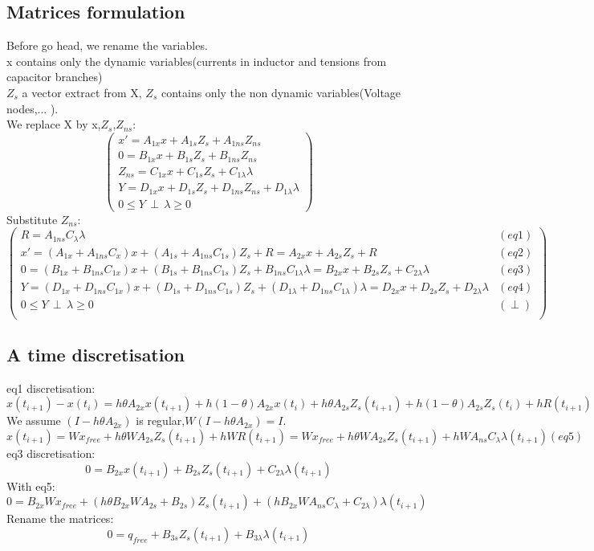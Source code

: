 \documentclass[10pt]{article}
\begin{document}
\subsection{Matrices formulation}
Before go head, we rename the variables.\\
x contains only the dynamic variables(currents in inductor and tensions from capacitor branches)\\
$Z_{s}$ a vector extract from X, $Z_{s}$ contains only the non dynamic variables(Voltage nodes,... ).\\

We replace X by x,$Z_{s}$,$Z_{ns}$:
\[\left(\begin{array}{c}
x'=A_{1x}x +A_{1s}Z_{s} + A_{1ns}Z_{ns}\\
0=B_{1x}x+B_{1s}Z_{s} + B_{1ns}Z_{ns}\\
Z_{ns}= C_{1x}x+C_{1s}Z_{s}+C_{1\lambda}\lambda \\
Y=D_{1x}x +D_{1s}Z_{s}+D_{1ns}Z_{ns}+D_{1\lambda}\lambda\\
0 \leq Y \, \perp \, \lambda \geq 0
\end{array}\right)\]
Substitute $Z_{ns}$:
\[\left(\begin{array}{cc}
R=A_{1ns}C_{\lambda}\lambda &(eq1)\\
x'=(A_{1x}+A_{1ns}C_{x})x +(A_{1s}+A_{1ns}C_{1s})Z_{s} +R=A_{2x}x +A_{2s}Z_{s} +R&(eq2)\\
0=(B_{1x}+B_{1ns}C_{1x})x+(B_{1s}+B_{1ns}C_{1s})Z_{s} + B_{1ns}C_{1\lambda}\lambda = B_{2x}x+B_{2s}Z_{s} + C_{2\lambda}\lambda&(eq3)\\
Y=(D_{1x}+D_{1ns}C_{1x})x+(D_{1s}+D_{1ns}C_{1s})Z_{s}+(D_{1\lambda}+D_{1ns}C_{1\lambda})\lambda = D_{2x}x+D_{2s}Z_{s}+D_{2\lambda}\lambda &(eq4)\\
0 \leq Y \, \perp \, \lambda \geq 0&(\perp)\\
\end{array}\right)\]
\newpage

\subsection{A time discretisation}

 eq1 discretisation:
\[x(t_{i+1}) - x(t_{i})=h\theta A_{2x}x(t_{i+1})+h(1-\theta)A_{2x}x(t_{i}) +h\theta A_{2s}Z_{s}(t_{i+1}) +h(1-\theta)A_{2s}Z_s(t_{i}) +hR(t_{i+1})\]
We assume $(I-h\theta A_{2x})$ is regular,$W(I-h\theta A_{2x}) = I.$
\[x(t_{i+1})=Wx_{free}+h\theta WA_{2s}Z_{s}(t_{i+1})+hWR(t_{i+1}) = Wx_{free}+h\theta
WA_{2s}Z_{s}(t_{i+1}) 
+hWA_{ns}C_{\lambda}\lambda(t_{i+1}) (eq5)\]
eq3 discretisation:
\[0 = B_{2x}x(t_{i+1})+B_{2s}Z_{s}(t_{i+1}) + C_{2\lambda}\lambda(t_{i+1})\]
With eq5:
\[0 = B_{2x}Wx_{free}+(h\theta B_{2x} WA_{2s}+B_{2s})
Z_{s}(t_{i+1})+(hB_{2x}WA_{ns}C_{\lambda}+C_{2\lambda})\lambda(t_{i+1})\]
Rename the matrices:
\[0 = q_{free}+B_{3s} Z_{s}(t_{i+1})+B_{3\lambda}\lambda(t_{i+1})\]
\end{document}
